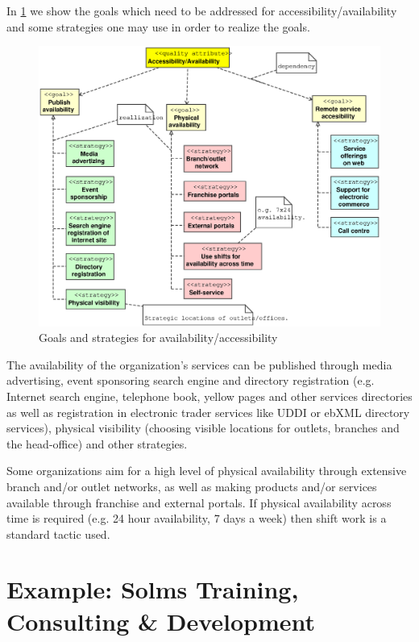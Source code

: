\documentclass[11pt,english,a4]{article}
\begin{document}
In \ref{accessibilityTactics_fig} we show the goals which need to be addressed for accessibility/availability and some strategies one may use in order to realize the goals.

\begin{figure}[hbt]
  \begin{center}
    \includegraphics[scale=0.4]{accessibilityTactics}
    \caption{Goals and strategies for availability/accessibility}\label{accessibilityTactics_fig}
  \end{center}
\end{figure}

The availability of the organization's services can be published through media advertising, event sponsoring search engine and directory registration (e.g. Internet search engine, telephone book, yellow pages and other services directories as well as registration in electronic trader services like UDDI or ebXML directory services), physical visibility (choosing visible locations for outlets, branches and the head-office) and other strategies.

Some organizations aim for a high level of physical availability through extensive branch and/or outlet networks, as well as making products and/or services available through franchise and external portals. If physical availability across time is required (e.g. 24 hour availability, 7 days a week) then shift work is a standard tactic used.

\section{Example: Solms Training, Consulting \& Development}
\end{document}
